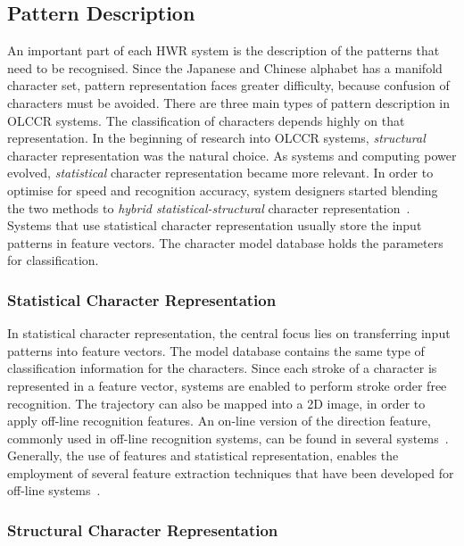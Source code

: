 \subsection{Pattern Description}
\label{sec:olccr:patterndescription}

An important part of each HWR system is the description of the patterns that
need to be recognised. Since the Japanese and Chinese alphabet has a manifold 
character set, pattern representation faces greater difficulty, because confusion
of characters must be avoided.
There are three main types of pattern description in OLCCR systems. The 
classification of characters depends highly on that representation.
In the beginning of research into OLCCR systems, \emph{structural} character 
representation was the natural choice. As systems and computing power evolved, 
\emph{statistical} character representation became more relevant. In order to 
optimise for speed and recognition accuracy, system designers started blending
the two methods to \emph{hybrid statistical-structural} character 
representation~. Systems that use statistical character
representation usually store the input patterns in feature vectors. The character
model database holds the parameters for classification.

\subsubsection{Statistical Character Representation} 
\label{sec:olccr:statisticalrepresentation}

In statistical character representation, the central focus lies on transferring
input patterns into feature vectors. The model database contains the same type
of classification information for the characters.
Since each stroke of a character is represented in a feature vector, 
systems are enabled to perform stroke order free recognition. The trajectory
can also be mapped into a 2D image, in order to apply off-line recognition 
features. An on-line version of the direction feature, commonly used in 
off-line recognition systems, can be found in several 
systems~. 
Generally, the use of features and statistical representation, 
enables the employment of several feature extraction techniques that have been 
developed for off-line systems~.

\subsubsection{Structural Character Representation}
\label{sec:olccr:structuralcharacterrepresentation}

